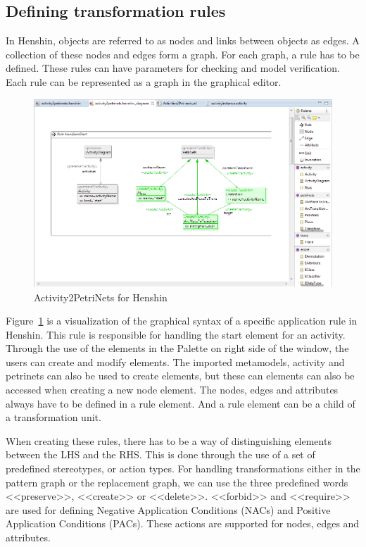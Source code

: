 \documentclass[pdftex,11pt,a4paper]{article}
\begin{document}
\subsection{Defining transformation rules}

\noindent In Henshin, objects are referred to as nodes and links between objects
as edges. A collection of these nodes and edges form a graph. For each graph, a
rule has to be defined. These rules can have parameters for checking and model
verification. Each rule can be represented as a graph in the graphical
editor. 

\begin{figure}[H]
	\centering
	\includegraphics[scale=0.5]{figures/Henshin_Screen.png}
	\caption{Activity2PetriNets for Henshin}
	\label{fig:HenshinScreen}
\end{figure}

Figure~\ref{fig:HenshinScreen} is a visualization of the graphical syntax of a
specific application rule in Henshin. This rule is responsible for handling the
start element for an activity. Through the use of the elements in the Palette on
right side of the window, the users can create and modify elements. The imported
metamodels, activity and petrinets can also be used to create elements, but
these can elements can also be accessed when creating a new node element. The
nodes, edges and attributes always have to be defined in a rule element. And a
rule element can be a child of a transformation unit.

\indent When creating these rules, there has to be a way of
distinguishing elements between the LHS and the RHS. This is done through the
use of a set of predefined stereotypes, or action types. For handling
transformations either in the pattern graph or the replacement graph, we can
use the three predefined words <<preserve>>, <<create>> or <<delete>>.
<<forbid>> and <<require>> are used for defining Negative Application
Conditions (NACs) and Positive Application Conditions (PACs). These actions are
supported for nodes, edges and attributes. 
\end{document}
